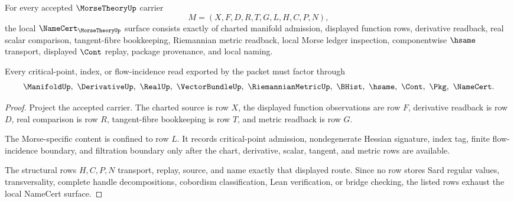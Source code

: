 \begin{theorem}
\label{thm:morse-theory-namecert-obligations}
For every accepted $\MorseTheoryUp$ carrier
$$
M=(X,F,D,R,T,G,L,H,C,P,N),
$$
the local $\NameCert_{\MorseTheoryUp}$ surface consists exactly of charted manifold admission, displayed function rows, derivative readback, real scalar comparison, tangent-fibre bookkeeping, Riemannian metric readback, local Morse ledger inspection, componentwise $\hsame$ transport, displayed $\Cont$ replay, package provenance, and local naming.

Every critical-point, index, or flow-incidence read exported by the packet must factor through
$$
\ManifoldUp,\ \DerivativeUp,\ \RealUp,\ \VectorBundleUp,\ \RiemannianMetricUp,\ \BHist,\ \hsame,\ \Cont,\ \Pkg,\ \NameCert .
$$
\end{theorem}
\begin{proof}
Project the accepted carrier. The charted source is row $X$, the displayed function observations are row $F$, derivative readback is row $D$, real comparison is row $R$, tangent-fibre bookkeeping is row $T$, and metric readback is row $G$.

The Morse-specific content is confined to row $L$. It records critical-point admission, nondegenerate Hessian signature, index tag, finite flow-incidence boundary, and filtration boundary only after the chart, derivative, scalar, tangent, and metric rows are available.

The structural rows $H,C,P,N$ transport, replay, source, and name exactly that displayed route. Since no row stores Sard regular values, transversality, complete handle decompositions, cobordism classification, Lean verification, or bridge checking, the listed rows exhaust the local NameCert surface.
\end{proof}



